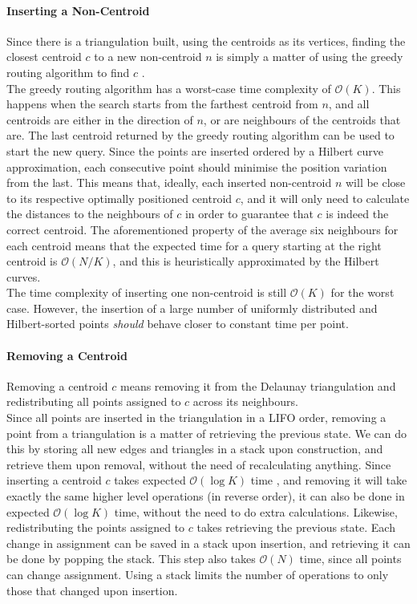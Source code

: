 \paragraph{Inserting a Non-Centroid}
Since there is a triangulation built, using the centroids as its vertices, finding the closest centroid $c$ to a new non-centroid $n$ is simply a matter of using the greedy routing algorithm to find $c$ \cite{greedyroute}.\\
The greedy routing algorithm has a worst-case time complexity of $\mathcal{O}(K)$. This happens when the search starts from the farthest centroid from $n$, and all centroids are either in the direction of $n$, or are neighbours of the centroids that are. 
The last centroid returned by the greedy routing algorithm can be used to start the new query. Since the points are inserted ordered by a Hilbert curve approximation, each consecutive point should minimise the position variation from the last.
This means that, ideally, each inserted non-centroid $n$ will be close to its respective optimally positioned centroid $c$, and it will only need to calculate the distances to the neighbours of $c$ in order to guarantee that $c$ is indeed the correct centroid.
The aforementioned property of the average six neighbours for each centroid means that the expected time for a query starting at the right centroid is $\mathcal{O}(N/K)$, and this is heuristically approximated by the Hilbert curves.\\
The time complexity of inserting one non-centroid is still $\mathcal{O}(K)$ for the worst case. However, the insertion of a large number of uniformly distributed and Hilbert-sorted points \emph{should} behave closer to constant time per point.

\paragraph{Removing a Centroid}
Removing a centroid $c$ means removing it from the Delaunay triangulation and redistributing all points assigned to $c$ across its neighbours.\\
Since all points are inserted in the triangulation in a LIFO order, removing a point from a triangulation is a matter of retrieving the previous state. We can do this by storing all new edges and triangles in a stack upon construction, and retrieve them upon removal, without the need of recalculating anything. Since inserting a centroid $c$ takes expected $\mathcal{O}(\log{K})$ time \cite{tricomplex}, and removing it will take exactly the same higher level operations (in reverse order), it can also be done in expected $\mathcal{O}(\log{K})$ time, without the need to do extra calculations.
Likewise, redistributing the points assigned to $c$ takes retrieving the previous state. Each change in assignment can be saved in a stack upon insertion, and retrieving it can be done by popping the stack.
This step also takes $\mathcal{O}(N)$ time, since all points can change assignment. Using a stack limits the number of operations to only those that changed upon insertion.


